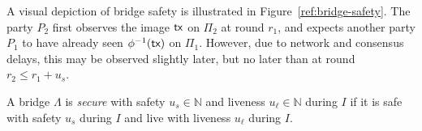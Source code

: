 A visual depiction of bridge safety is illustrated in Figure~\ref{ref:bridge-safety}.
The party $P_2$ first observes the image $\textsf{tx}$ on $\Pi_2$ at round $r_1$, and expects
another party $P_1$ to have already seen $\phi^{-1}(\textsf{tx})$ on $\Pi_1$. However, due to
network and consensus delays, this may be observed slightly later, but no later than at
round $r_2 \leq r_1 + u_s$.

\begin{definition}
  A bridge $\Lambda$ is \emph{secure} with safety $u_s \in \mathbb{N}$ and
  liveness $u_\ell \in \mathbb{N}$ during $I$ if it is safe with safety $u_s$ during $I$
  and live with liveness $u_\ell$ during $I$.
\end{definition} 

